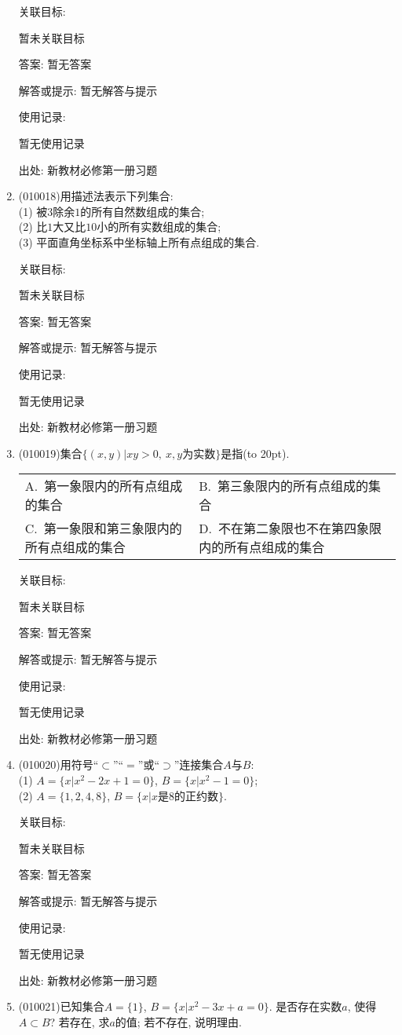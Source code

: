\documentclass[10pt,a4paper]{article}
\newcommand{\bracket}[1]{(\hbox to #1pt{})}
\newcommand{\twoch}[4]{\par\begin{tabular}{p{.46\textwidth}p{.46\textwidth}}
A.~#1& B.~#2\\
C.~#3& D.~#4
\end{tabular}}
\begin{document}
\begin{enumerate}[1.]
关联目标:

暂未关联目标

答案: 暂无答案

解答或提示: 暂无解答与提示

使用记录:

暂无使用记录


出处: 新教材必修第一册习题
\item { (010018)}用描述法表示下列集合:\\
(1) 被$3$除余$1$的所有自然数组成的集合;\\
(2) 比$1$大又比$10$小的所有实数组成的集合;\\
(3) 平面直角坐标系中坐标轴上所有点组成的集合.


关联目标:

暂未关联目标

答案: 暂无答案

解答或提示: 暂无解答与提示

使用记录:

暂无使用记录


出处: 新教材必修第一册习题
\item { (010019)}集合$\{(x, y)|xy>0, \ x,y\text{为实数}\}$是指\bracket{20}.
\twoch{第一象限内的所有点组成的集合}{第三象限内的所有点组成的集合}{第一象限和第三象限内的所有点组成的集合}{不在第二象限也不在第四象限内的所有点组成的集合}


关联目标:

暂未关联目标

答案: 暂无答案

解答或提示: 暂无解答与提示

使用记录:

暂无使用记录


出处: 新教材必修第一册习题
\item { (010020)}用符号``$\subset$''``$=$''或``$\supset$''连接集合$A$与$B$:\\
(1) $A=\{x|x^2-2x+1=0\}$, $B=\{x|x^2-1=0\}$;\\
(2) $A=\{1, 2, 4, 8\}$, $B=\{x|x$是$8$的正约数$\}$.


关联目标:

暂未关联目标

答案: 暂无答案

解答或提示: 暂无解答与提示

使用记录:

暂无使用记录


出处: 新教材必修第一册习题
\item { (010021)}已知集合$A=\{1\}$, $B=\{x|x^2-3x+a=0\}$. 是否存在实数$a$, 使得$A\subset B$?  若存在, 求$a$的值; 若不存在, 说明理由.



\end{enumerate}
\end{document}
